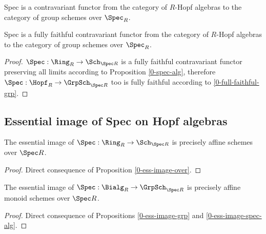 \begin{definition}
  \label{0-spec-hopf}
  \leanok

  Spec is a contravariant functor from the category of $R$-Hopf algebras to the category of group schemes over $\Spec_R$.
\end{definition}


\begin{proposition}
  \label{0-full-faithful-spec-hopf}
  \leanok

  Spec is a fully faithful contravariant functor from the category of $R$-Hopf algebras to the category of group schemes over $\Spec_R$.
\end{proposition}
\begin{proof}
  \leanok

  $\Spec : \Ring_R \to \Sch_{\Spec R}$ is a fully faithful contravariant functor
  preserving all limits according to Proposition \ref{0-spec-alg},
  therefore $\Spec : \Hopf_R \to \GrpSch_{\Spec R}$ too is fully faithful
  according to \ref{0-full-faithful-grp}.
\end{proof}


\subsection{Essential image of Spec on Hopf algebras}


\begin{proposition}
  \label{0-ess-image-spec-alg}
  \leanok

  The essential image of $\Spec : \Ring_R \to \Sch_{\Spec R}$ is precisely
  affine schemes over $\Spec R$.
\end{proposition}
\begin{proof}
  \leanok

  Direct consequence of Proposition \ref{0-ess-image-over}.
\end{proof}


\begin{proposition}
  \label{0-ess-image-spec-bialg}
  \leanok

  The essential image of $\Spec : \Bialg_R \to \GrpSch_{\Spec R}$ is precisely
  affine monoid schemes over $\Spec R$.
\end{proposition}
\begin{proof}
  \leanok

  Direct consequence of Propositions \ref{0-ess-image-grp} and \ref{0-ess-image-spec-alg}.
\end{proof}


